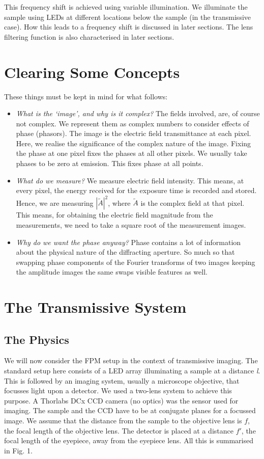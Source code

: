 \documentclass[11pt,a4paper,journal]{IEEEtran}
\begin{document}
This frequency shift is achieved using variable illumination. We illuminate the sample using LEDs at different locations below the sample (in the transmissive case). How this leads to a frequency shift is discussed in later sections. The lens filtering function is also characterised in later sections.

\section{Clearing Some Concepts}
These things must be kept in mind for what follows:
\begin{itemize}
\item \textit{What is the `image', and why is it complex?} The fields involved, are, of course not complex. We represent them as complex numbers to consider effects of phase (phasors). The image is the electric field transmittance at each pixel. Here, we realise the significance of the complex nature of the image. Fixing the phase at one pixel fixes the phases at all other pixels. We usually take phases to be zero at emission. This fixes phase at all points.
\item \textit{What do we measure?} We measure electric field intensity. This means, at every pixel, the energy received for the exposure time is recorded and stored. Hence, we are measuring $|\tilde{A}|^2$, where $\tilde{A}$ is the complex field at that pixel. This means, for obtaining the electric field magnitude from the measurements, we need to take a square root of the measurement images.
\item \textit{Why do we want the phase anyway?} Phase contains a lot of information about the physical nature of the diffracting aperture. So much so that swapping phase components of the Fourier transforms of two images keeping the amplitude images the same swaps visible features as well.
\end{itemize}

\section{The Transmissive System}

\subsection{The Physics}
We will now consider the FPM setup in the context of transmissive imaging. The standard setup here consists of a LED array illuminating a sample at a distance \textit{l}. This is followed by an imaging system, usually a microscope objective, that focusses light upon a detector. We used a two-lens system to achieve this purpose. A Thorlabs DCx CCD camera (no optics) was the sensor used for imaging. The sample and the CCD have to be at conjugate planes for a focussed image. We assume that the distance from the sample to the objective lens is $f$, the focal length of the objective lens. The detector is placed at a distance $f'$, the focal length of the eyepiece, away from the eyepiece lens. All this is summarised in Fig. 1.
\end{document}
